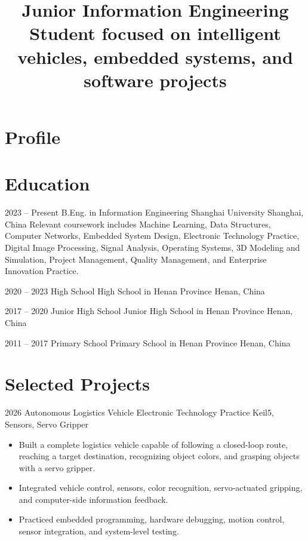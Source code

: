 \documentclass[10pt,a4paper,sans]{moderncv}
\title{Junior Information Engineering Student focused on intelligent vehicles, embedded systems, and software projects}
\begin{document}
\makecvtitle

\section{Profile}

\section{Education}

\cventry
{2023 -- Present}
{B.Eng. in Information Engineering}
{Shanghai University}
{Shanghai, China}
{}
{
Relevant coursework includes Machine Learning, Data Structures, Computer Networks, Embedded System Design, Electronic Technology Practice, Digital Image Processing, Signal Analysis, Operating Systems, 3D Modeling and Simulation, Project Management, Quality Management, and Enterprise Innovation Practice.
}

\cventry
{2020 -- 2023}
{High School}
{High School in Henan Province}
{Henan, China}
{}
{}

\cventry
{2017 -- 2020}
{Junior High School}
{Junior High School in Henan Province}
{Henan, China}
{}
{}

\cventry
{2011 -- 2017}
{Primary School}
{Primary School in Henan Province}
{Henan, China}
{}
{}

\section{Selected Projects}

\cventry
{2026}
{Autonomous Logistics Vehicle}
{Electronic Technology Practice}
{Keil5, Sensors, Servo Gripper}
{}
{
\begin{itemize}
    \item Built a complete logistics vehicle capable of following a closed-loop route, reaching a target destination, recognizing object colors, and grasping objects with a servo gripper.
    \item Integrated vehicle control, sensors, color recognition, servo-actuated gripping, and computer-side information feedback.
    \item Practiced embedded programming, hardware debugging, motion control, sensor integration, and system-level testing.
\end{itemize}
}
\end{document}
